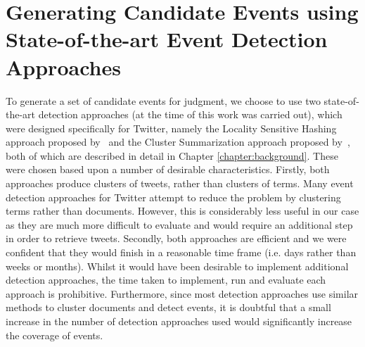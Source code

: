 \section{Generating Candidate Events using State-of-the-art Event Detection Approaches}

To generate a set of candidate events for judgment, we choose to use two state-of-the-art detection approaches (at the time of this work was carried out), which were designed specifically for Twitter, namely the Locality Sensitive Hashing approach proposed by~\cite{Petrovic:2010:SFS:1857999.1858020} and the Cluster Summarization approach proposed by~\cite{Aggarwal12}, both of which are described in detail in Chapter \ref{chapter:background}.
These were chosen based upon a number of desirable characteristics.
Firstly, both approaches produce clusters of tweets, rather than clusters of terms.
Many event detection approaches for Twitter attempt to reduce the problem by clustering terms rather than documents.
However, this is considerably less useful in our case as they are much more difficult to evaluate and would require an additional step in order to retrieve tweets.
Secondly, both approaches are efficient and we were confident that they would finish in a reasonable time frame (i.e. days rather than weeks or months).
Whilst it would have been desirable to implement additional detection approaches, the time taken to implement, run and evaluate each approach is prohibitive.
Furthermore, since most detection approaches use similar methods to cluster documents and detect events, it is doubtful that a small increase in the number of detection approaches used would significantly increase the coverage of events.


